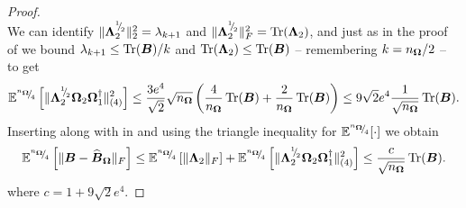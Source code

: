 \begin{proof}
\begin{equation}
    \end{equation}
    We can identify $\lVert \boldsymbol{\Lambda}_2^{{}^{1}{\mskip -5mu/\mskip -3mu}_{2}} \rVert _2^2 = \lambda_{k+1}$ and $\lVert \boldsymbol{\Lambda}_2^{{}^{1}{\mskip -5mu/\mskip -3mu}_{2}} \rVert _F^2 = \operatorname{Tr}(\boldsymbol{\Lambda}_2)$, and just as in the proof of \cite[Lemma 3.1]{meyer-2021-hutch-optimal} we bound $\lambda_{k+1} \leq \operatorname{Tr}(\boldsymbol{B})/k$ and $\operatorname{Tr}(\boldsymbol{\Lambda}_2) \leq \operatorname{Tr}(\boldsymbol{B})$ -- remembering $k = n_{\boldsymbol{\Omega}}/2$ -- to get 
    \begin{equation}
        \mathbb{E}^{{}^{n_{\boldsymbol{\Omega}}}{\mskip -5mu/\mskip -3mu}_{4}}\left[ \lVert \boldsymbol{\Lambda}_2^{{}^{1}{\mskip -5mu/\mskip -3mu}_{2}} \boldsymbol{\Omega}_2 \boldsymbol{\Omega}_1^{\dagger} \rVert _{(4)}^2 \right]
        \leq \frac{3 e^4}{\sqrt{2}}  \sqrt{n_{\boldsymbol{\Omega}}} \left( \frac{4}{n_{\boldsymbol{\Omega}}} \operatorname{Tr}(\boldsymbol{B}) + \frac{2}{n_{\boldsymbol{\Omega}}} \operatorname{Tr}(\boldsymbol{B}) \right)
        \leq 9 \sqrt{2} e^4 \frac{1}{\sqrt{n_{\boldsymbol{\Omega}}}} \operatorname{Tr}(\boldsymbol{B}).
        \label{equ:nystrom-proof-tail-bound}
    \end{equation}
    Inserting  along with  in  and using the triangle inequality for $\mathbb{E}^{{}^{n_{\boldsymbol{\Omega}}}{\mskip -5mu/\mskip -3mu}_{4}}[\cdot]$ we obtain
    \begin{equation}
        \mathbb{E}^{{}^{n_{\boldsymbol{\Omega}}}{\mskip -5mu/\mskip -3mu}_{4}} \left[\lVert \boldsymbol{B} - \widehat{\boldsymbol{B}}_{\boldsymbol{\Omega}} \rVert _F \right]
        \leq \mathbb{E}^{{}^{n_{\boldsymbol{\Omega}}}{\mskip -5mu/\mskip -3mu}_{4}} \left[ \lVert \boldsymbol{\Lambda}_2 \rVert _F \right] + \mathbb{E}^{{}^{n_{\boldsymbol{\Omega}}}{\mskip -5mu/\mskip -3mu}_{4}} \left[ \lVert \boldsymbol{\Lambda}_2^{{}^{1}{\mskip -5mu/\mskip -3mu}_{2}} \boldsymbol{\Omega}_2 \boldsymbol{\Omega}_1^{\dagger} \rVert _{(4)}^2 \right]
        \leq \frac{c}{\sqrt{n_{\boldsymbol{\Omega}}}} \operatorname{Tr}(\boldsymbol{B}).
    \end{equation}
    where $c = 1 + 9 \sqrt{2} e^4$.


\end{proof}
